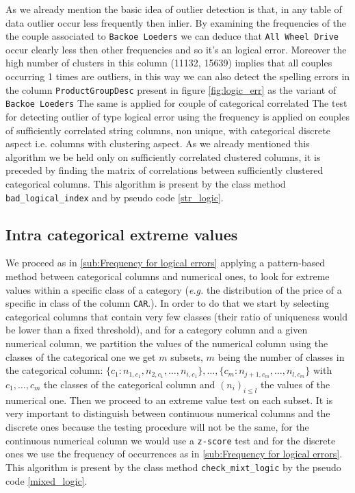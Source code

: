 \documentclass{article}
\begin{document}
As we already mention the basic idea of outlier detection is that, in any table of data outlier occur less frequently then inlier.
By examining the frequencies of the the couple associated to \texttt{Backoe Loeders} we can deduce that \texttt{All Wheel Drive} occur clearly less then other frequencies and so it's an logical error. Moreover the high number of clusters in this column (11132, 15639) implies that all couples occurring 1 times are outliers, in this way we can also detect the spelling errors in the column \texttt{ProductGroupDesc} present in figure \ref{fig:logic_err} as the variant of \texttt{Backoe Loeders}
The same is applied for couple of categorical correlated
The test for detecting outlier of type logical error using the frequency is applied on couples of sufficiently correlated string columns, non unique, with categorical discrete aspect i.e. columns with clustering aspect.
As we already mentioned this algorithm we be held only on sufficiently correlated clustered columns, it is preceded by finding the matrix of correlations between sufficiently clustered  categorical columns.
This algorithm is present by the class method \texttt{bad\_logical\_index} and by pseudo code \ref{str_logic}.

\subsection{Intra categorical extreme values} %
\label{sub:Intra categorical extreme values}
We proceed as in \ref{sub:Frequency for logical errors} applying a pattern-based method between categorical columns and numerical ones, to look for extreme values within a specific class of a category (\textit{e.g.} the distribution of the price of a specific in class of the column \texttt{CAR}.). In order to do that we start by selecting categorical columns that contain very few classes (their ratio of uniqueness would be lower than a fixed threshold), and for a category column and a given numerical column, we partition the values of the numerical column using the classes of the categorical one we get $m$ subsets, $m$ being the number of classes in the categorical column: $\{c_1: n_{1, c_1}, n_{2, c_1}, \ldots, n_{i, c_1}\}, \ldots, \{c_m: n_{j+1, c_m}, \ldots,  n_{l, c_m}\}$ with $c_1, \ldots, c_m$ the classes of the categorical column and $(n_i)_{i \leq l}$ the values of the numerical one. Then we proceed to an extreme value test on each subset.
It is very important to distinguish between continuous numerical columns and the discrete ones because the testing procedure will not be the same, for the continuous numerical column we would use a \texttt{z-score} test and for the discrete ones we use the frequency of occurrences as in \ref{sub:Frequency for logical errors}.
This algorithm is present by the class method \texttt{check\_mixt\_logic} by the pseudo code \ref{mixed_logic}.
\end{document}
